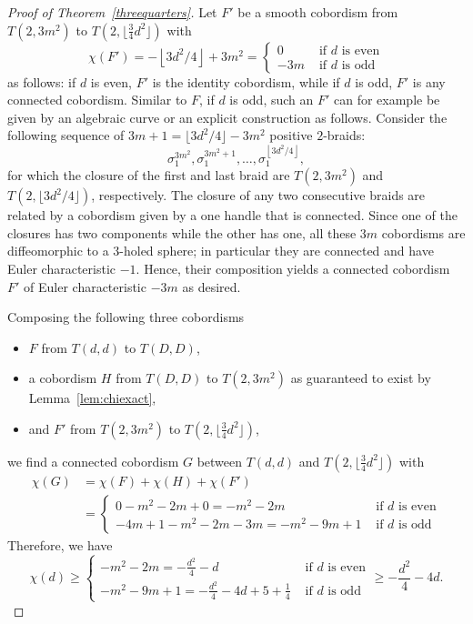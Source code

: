 \documentclass[10pt,a4paper]{article}
\theoremstyle{definition}
\numberwithin{equation}{section}
\begin{document}
\begin{proof}[Proof of Theorem~\ref{threequarters}]
Let $F'$ be a smooth cobordism from $T(2,3m^2)$ to $T(2,\lfloor \frac{3}{4}d^2\rfloor)$ with
\[
\chi(F')=-\left\lfloor 3d^2/4\right\rfloor+3m^2=
\begin{cases}
0&\text{ if $d$ is even}\\
-3m&\text{ if $d$ is odd}
\end{cases}
\]
as follows: if $d$ is even, $F'$ is the identity cobordism, while if $d$ is odd, $F'$ is any connected cobordism. Similar to $F$, if $d$ is odd, such an $F'$ can for example be given by an algebraic curve or an explicit construction as follows. Consider the following sequence of $3m+1=\lfloor 3d^2/4\rfloor-3m^2$ positive $2$-braids:
\[
\sigma_1^{3m^2},
\sigma_1^{3m^2+1},
\dots,
\sigma_1^{\left\lfloor 3d^2/4\right\rfloor},
\]
for which the closure of the first and last braid are $T(2,3m^2)$ and $T(2,\lfloor 3d^2/4\rfloor)$, respectively. The closure of any two consecutive braids are related by a cobordism given by a one handle that is connected. Since one of the closures has two components while the other has one, all these $3m$ cobordisms are diffeomorphic to a $3$-holed sphere; in particular they are connected and have Euler characteristic $-1$. Hence, their composition yields a connected cobordism $F'$ of Euler characteristic $-3m$ as desired.

Composing the following three cobordisms
\begin{itemize}
\item $F$ from $T(d,d)$ to $T(D,D)$,
\item a cobordism $H$ from $T(D,D)$ to $T(2,3m^2)$ as guaranteed to exist by Lem\-ma~\ref{lem:chiexact},
\item and $F'$ from $T(2,3m^2)$ to $T(2,\lfloor \frac{3}{4}d^2\rfloor)$,
\end{itemize}
we find a connected cobordism $G$ between $T(d,d)$ and $T(2,\lfloor\frac{3}{4}d^2\rfloor)$ with
\begin{align*}
\chi(G)&= \chi(F)+\chi(H)+\chi(F')
\\&=
\begin{cases}
0-m^2-2m+0=-m^2-2m&\text{ if $d$ is even}\\
-4m+1-m^2-2m-3m=-m^2-9m+1&\text{ if $d$ is odd}
\end{cases}
\end{align*}
Therefore, we have
\[
\chi(d)\geq
\begin{cases}
-m^2-2m=-\frac{d^2}{4}-d&\text{ if $d$ is even}\\-m^2-9m+1=-\frac{d^2}{4}-4d+5+\frac{1}{4}&\text{ if $d$ is odd}
\end{cases}
\geq-\frac{d^2}{4}-4d.
\]


\end{proof}
\end{document}
